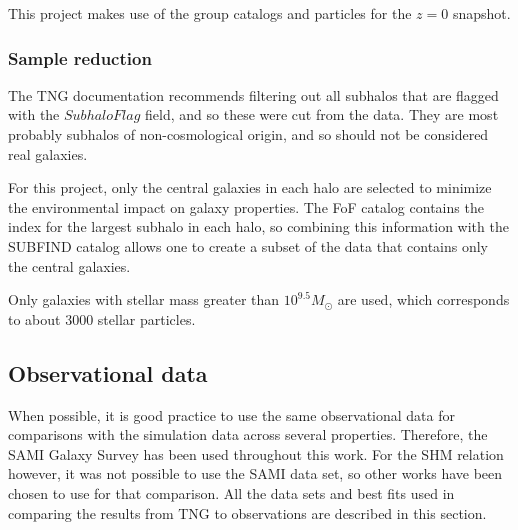 This project makes use of the group catalogs and particles for the $z=0$ snapshot.

\subsubsection{Sample reduction}

The TNG documentation recommends filtering out all subhalos that are flagged with the $SubhaloFlag$ field, and so these were cut from the data. They are most probably subhalos of non-cosmological origin, and so should not be considered real galaxies.

For this project, only the central galaxies in each halo are selected to minimize the environmental impact on galaxy properties. The FoF catalog contains the index for the largest subhalo in each halo, so combining this information with the SUBFIND catalog allows one to create a subset of the data that contains only the central galaxies.

Only galaxies with stellar mass greater than $10^{9.5} M_{\odot}$ are used, which corresponds to about 3000 stellar particles.

\subsection{Observational data}
When possible, it is good practice to use the same observational data for comparisons with the simulation data across several properties. Therefore, the SAMI Galaxy Survey \parencite{Bryant2015} has been used throughout this work. For the SHM relation however, it was not possible to use the SAMI data set, so other works have been chosen to use for that comparison. All the data sets and best fits used in comparing the results from TNG to observations are described in this section.

